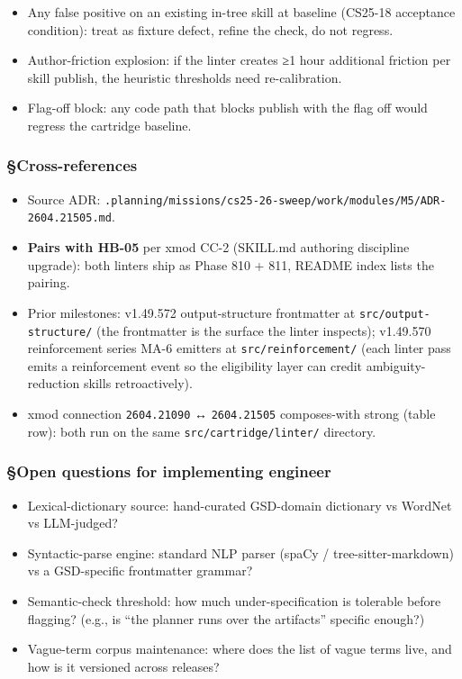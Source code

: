 \documentclass[11pt,letterpaper]{article}
\newcommand{\arxivid}[1]{\texttt{\textcolor{accent}{#1}}}
\providecommand{\tightlist}{\setlength{\itemsep}{0pt}\setlength{\parskip}{0pt}}
\begin{document}
\begin{itemize}
\tightlist
\item
  Any false positive on an existing in-tree skill at baseline (CS25-18
  acceptance condition): treat as fixture defect, refine the check, do
  not regress.
\item
  Author-friction explosion: if the linter creates ≥1 hour additional
  friction per skill publish, the heuristic thresholds need
  re-calibration.
\item
  Flag-off block: any code path that blocks publish with the flag off
  would regress the cartridge baseline.
\end{itemize}

\subsubsection{§Cross-references}

\begin{itemize}
\tightlist
\item
  Source ADR:
  \texttt{.planning/missions/cs25-26-sweep/work/modules/M5/ADR-\arxivid{2604.21505}.md}.
\item
  \textbf{Pairs with HB-05} per xmod CC-2 (SKILL.md authoring discipline
  upgrade): both linters ship as Phase 810 + 811, README index lists the
  pairing.
\item
  Prior milestones: v1.49.572 output-structure frontmatter at
  \texttt{src/output-structure/} (the frontmatter is the surface the
  linter inspects); v1.49.570 reinforcement series MA-6 emitters at
  \texttt{src/reinforcement/} (each linter pass emits a reinforcement
  event so the eligibility layer can credit ambiguity-reduction skills
  retroactively).
\item
  xmod connection \arxivid{2604.21090} ↔ \arxivid{2604.21505}
  composes-with strong (table row): both run on the same
  \texttt{src/cartridge/linter/} directory.
\end{itemize}

\subsubsection{§Open questions for implementing
engineer}

\begin{itemize}
\tightlist
\item
  Lexical-dictionary source: hand-curated GSD-domain dictionary vs
  WordNet vs LLM-judged?
\item
  Syntactic-parse engine: standard NLP parser (spaCy /
  tree-sitter-markdown) vs a GSD-specific frontmatter grammar?
\item
  Semantic-check threshold: how much under-specification is tolerable
  before flagging? (e.g., is ``the planner runs over the artifacts''
  specific enough?)
\item
  Vague-term corpus maintenance: where does the list of vague terms
  live, and how is it versioned across releases?
\end{itemize}
\end{document}
